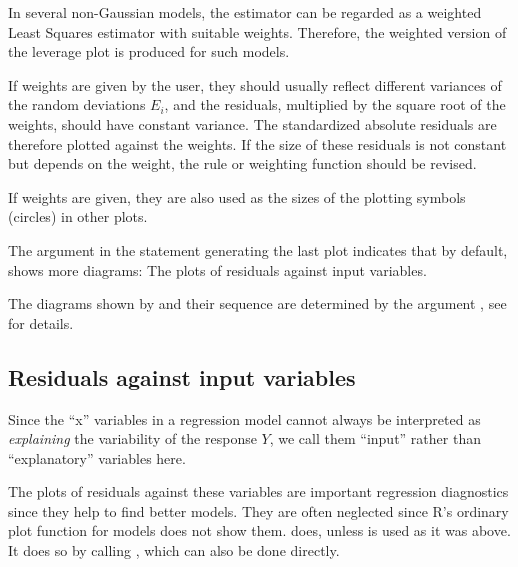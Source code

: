 \documentclass[11pt]{article}\usepackage[]{graphicx}\usepackage[]{color}
\begin{document}

In several non-Gaussian models, the estimator can be regarded as a weighted
Least Squares estimator with suitable weights. 
Therefore, the weighted version of the leverage plot is produced for such
models. 

If weights are given by the user, they should usually reflect different
variances of the random deviations $E_i$, and the residuals, multiplied by the
square root of the weights, should have constant variance.
The standardized absolute residuals are therefore plotted against the weights.
If the size of these residuals is not constant but depends on the weight, 
the rule or weighting function should be revised.

If weights are given, they are also used as the sizes of the plotting
symbols (circles) in other plots.


The argument  in the statement generating the last plot
indicates that by default,  
shows more diagrams: The plots of residuals against input variables.

The diagrams shown by  and their sequence are determined by
the argument , see  for details.

\subsection{Residuals against input variables}
Since the ``x'' variables in a regression model cannot always be
interpreted as \emph{explaining} the variability of the response $Y$,
we call them ``input'' rather than ``explanatory'' variables here.

The plots of residuals against these variables are important regression
diagnostics since they help to find better models. 
They are often neglected since R's ordinary plot function
for models does not show them. 
 does, unless  is used as it was above.
It does so by calling , which can also be done directly.
\end{document}
